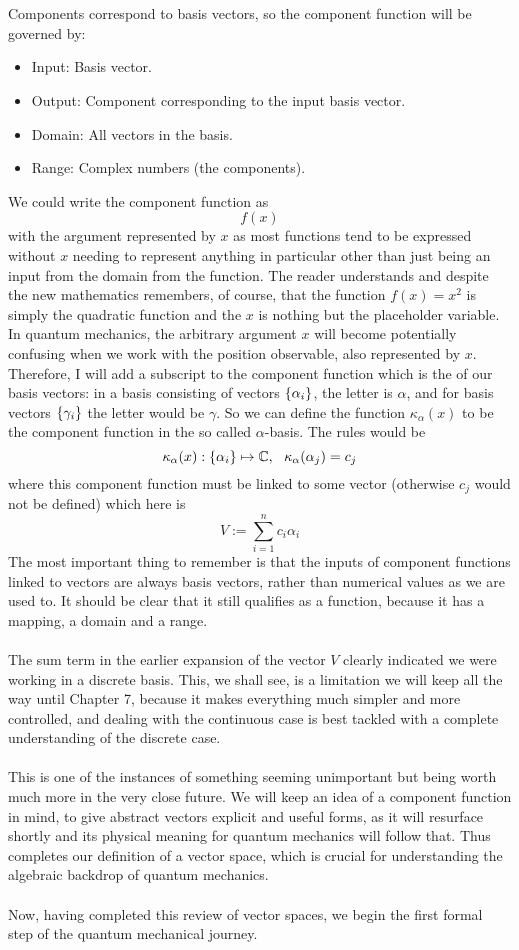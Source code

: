 \\\\
Components correspond to basis vectors, so the component function will be governed by:
\begin{itemize}
    \item Input: Basis vector.
    \item Output: Component corresponding to the input basis vector.
    \item Domain: All vectors in the basis.
    \item Range: Complex numbers (the components).
\end{itemize}
We could write the component function as 
$$
f(x) 
$$
with the argument represented by $x$ as most functions tend to be expressed without $x$ needing to represent anything in particular other than just being an input from the domain from the function. The reader understands and despite the new mathematics remembers, of course, that the function $f(x)=x^2$ is simply the quadratic function and the $x$ is nothing but the placeholder variable. In quantum mechanics, the arbitrary argument $x$ will become potentially confusing when we work with the position observable, also represented by $x$. Therefore, I will add a subscript to the component function which is the  of our basis vectors: in a basis consisting of vectors $\{\alpha_{i}\}$, the letter is $\alpha$, and for basis vectors $\{\gamma_{i}\}$ the letter would be $\gamma$. So we can define the function $\kappa_{\alpha}(x)$ to be the component function in the so called $\alpha$-basis. The rules would be 
$$
\kappa_{\alpha}(x):\{\alpha_{i}\}\mapsto\mathbb{C},\:\:\: \kappa_{\alpha}(\alpha_{j})=c_{j}
$$
where this component function must be linked to some vector (otherwise $c_{j}$ would not be defined) which here is
$$
V:=\sum_{i=1}^{n}c_{i}\alpha_{i}
$$
The most important thing to remember is that the inputs of component functions linked to vectors are always basis vectors, rather than numerical values as we are used to. It should be clear that it still qualifies as a function, because it has a mapping, a domain and a range.
\\\\
The sum term in the earlier expansion of the vector $V$ clearly indicated we were working in a discrete basis. This, we shall see, is a limitation we will keep all the way until Chapter 7, because it makes everything much simpler and more controlled, and dealing with the continuous case is best tackled with a complete understanding of the discrete case.
\\\\
This is one of the instances of something seeming unimportant but being worth much more in the very close future. We will keep an idea of a component function in mind, to give abstract vectors explicit and useful forms, as it will resurface shortly and its physical meaning for quantum mechanics will follow that. Thus completes our definition of a vector space, which is crucial for understanding the algebraic backdrop of quantum mechanics. 
\\\\
Now, having completed this review of vector spaces, we begin the first formal step of the quantum mechanical journey.
